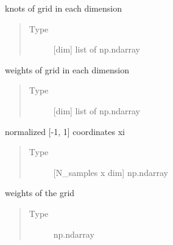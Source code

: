 \documentclass[letterpaper,10pt,english,openany,oneside]{sphinxmanual}
\begin{document}
\begin{fulllineitems}

\begin{fulllineitems}
\label{\detokenize{pygpc:pygpc.grid.TensorGrid.knots_dim_list}}
knots of grid in each dimension
\begin{quote}\begin{description}
\item[{Type}] \leavevmode
{[}dim{]} list of np.ndarray

\end{description}\end{quote}

\end{fulllineitems}


\begin{fulllineitems}
\label{\detokenize{pygpc:pygpc.grid.TensorGrid.weights_dim_list}}
weights of grid in each dimension
\begin{quote}\begin{description}
\item[{Type}] \leavevmode
{[}dim{]} list of np.ndarray

\end{description}\end{quote}

\end{fulllineitems}


\begin{fulllineitems}
\label{\detokenize{pygpc:pygpc.grid.TensorGrid.coords_norm}}
normalized {[}-1, 1{]} coordinates xi
\begin{quote}\begin{description}
\item[{Type}] \leavevmode
{[}N\_samples x dim{]} np.ndarray

\end{description}\end{quote}

\end{fulllineitems}


\begin{fulllineitems}
\label{\detokenize{pygpc:pygpc.grid.TensorGrid.weights}}
weights of the grid
\begin{quote}\begin{description}
\item[{Type}] \leavevmode
np.ndarray


\end{description}
\end{quote}
\end{fulllineitems}
\end{fulllineitems}
\end{document}
